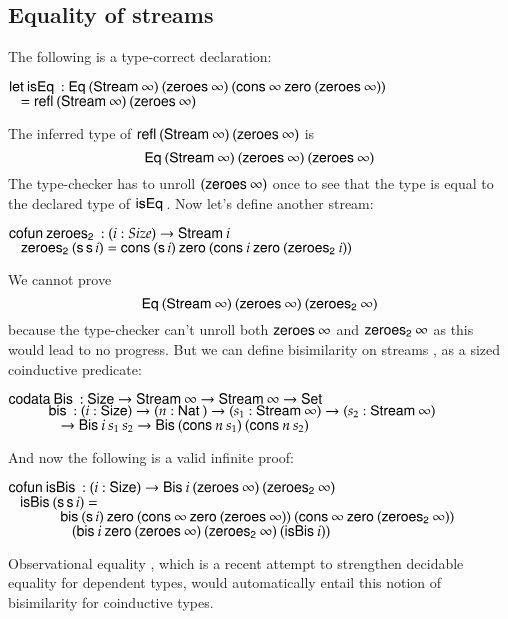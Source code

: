 \subsection{Equality of streams}
\label{heq}
The following is a type-correct declaration:
\begin{bsp}
$\mathsf{let}\: \mathsf{isEq}\: : \mathsf{Eq}\: (\mathsf{Stream}\: \infty) \: (\mathsf{zeroes}\: \infty) \: (\mathsf{cons}\: \infty \: \mathsf{zero}\: (\mathsf{zeroes}\: \infty))$\\
$\hspace*{3mm} = \mathsf{refl}\: (\mathsf{Stream}\: \infty) \: (\mathsf{zeroes}\: \infty)$
\end{bsp}
The inferred type of $\mathsf{refl}\: (\mathsf{Stream}\: \infty) \: (\mathsf{zeroes}\: \infty)$ is 
\[\mathsf{Eq}\: (\mathsf{Stream}\: \infty) \: (\mathsf{zeroes}\: \infty) \: (\mathsf{zeroes}\: \infty)\]
The type-checker has to unroll $(\mathsf{zeroes}\: \infty)$ once to see that the type is equal to the declared type of $\mathsf{isEq}\:$.
Now let's define another stream:
\begin{bsp}
$\mathsf{cofun}\: \mathsf{zeroes_2}\:: ( i : Size ) \rightarrow{\mathsf{Stream}\:i} $ \\
$\hspace*{3mm} \mathsf{zeroes_2}\: (\mathsf{s}\, \mathsf{s}\, i) = \mathsf{cons}\: (\mathsf{s}\, i) \: \mathsf{zero}\: (\mathsf{cons}\: i \: \mathsf{zero}\: (\mathsf{zeroes_2}\: i))$
\end{bsp}
We cannot prove \[\mathsf{Eq}\: (\mathsf{Stream}\: \infty) \: (\mathsf{zeroes}\: \infty) \: (\mathsf{zeroes_2}\: \infty)\]
because the type-checker can't unroll both $\mathsf{zeroes}\: \infty$ and $\mathsf{zeroes_2}\: \infty$ as
this would lead to no progress.
But we can define bisimilarity on streams \cite{coquand-infinite}, as a sized coinductive predicate:
\begin{bsp}
$\mathsf{codata}\: \mathsf{Bis}\: : \mathsf{Size} \rightarrow \mathsf{Stream}\: \infty \rightarrow \mathsf{Stream}\: \infty \rightarrow \mathsf{Set}$\\
$ \spcx \beq : (i : \Size ) \ra ( n : \Nat ) \ra (s_1 : \SStream \infty ) \ra (s_2 : \SStream \infty )$\\
$ \spcx \spc  \ra \beqd i \: s_1 \: s_2 \ra \beqd (\cons n \: s_1) \: (\cons n \: s_2)$
\end{bsp}
\noindent And now the following is a valid infinite proof:
\begin{bsp}
$\mathsf{cofun}\: \mathsf{isBis}\: : (i : \mathsf{Size} ) \rightarrow \mathsf{Bis}\: i \: (\mathsf{zeroes}\: \infty) \: (\mathsf{zeroes_2}\: \infty)$\\
$\hspace*{3mm} \mathsf{isBis}\: (\mathsf{s}\, \mathsf{s}\, i) = $\\
$\spc \spcx \beq (\s i) \: \zero (\cons \infty \: \zero (\zeroes \infty)) \: (\cons \infty \: \zero (\zeroest \infty))$\\ 
$\spc \spcx \spc (\beq i \: \zero (\zeroes \infty) \: (\zeroest \infty) \: (\eqt i))$
\end{bsp}
Observational equality \cite{conf/plpv/AltenkirchMS07}, which is a recent attempt to strengthen decidable equality for dependent types, would automatically entail this notion of bisimilarity for coinductive types.

